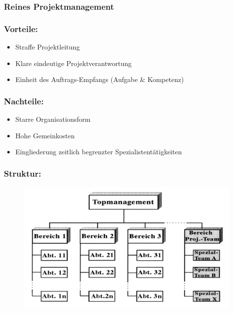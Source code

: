 \documentclass[11pt,a4paper]{article}
\begin{document}
\subsubsection{Reines Projektmanagement}
\begin{minipage}[t]{0.5\textwidth}
	\subsubsection*{Vorteile:}

	\begin{itemize}
	\itemsep0em
		\item Straffe Projektleitung
		\item Klare eindeutige Projektverantwortung
		\item Einheit des Auftrags-Empfangs (Aufgabe \& Kompetenz)
	\end{itemize}
	\subsubsection*{Nachteile:}

	\begin{itemize}
	\itemsep0em
		\item Starre Organisationsform
		\item Hohe Gemeinkosten
		\item Eingliederung zeitlich begrenzter Spezialistentätigkeiten
	\end{itemize}
\end{minipage}
\hspace{0.5cm}
\begin{minipage}[t]{0.45\textwidth}
	\subsubsection*{Struktur:}
	\begin{figure}[H]
	\includegraphics[width=\textwidth]{reines}
	\end{figure}
\end{minipage}
\vspace{1cm}
\end{document}
